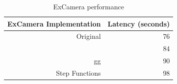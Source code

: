 
\begin{table}[]
  \centering
  \begin{tabular}{|r|r|}
    \hline
    \textbf{ExCamera Implementation} & \textbf{Latency (seconds)} \\ \hline
    Original        & 76                         \\ \hline
    \name{} & 84                         \\ \hline
    gg                       & 90                         \\ \hline
    Step Functions & 98                         \\ \hline
  \end{tabular}
  \caption{ExCamera performance}
  \label{table:excamera}
\end{table}

